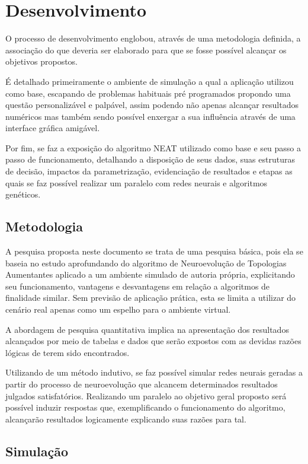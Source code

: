 \chapter{Desenvolvimento}
O processo de desenvolvimento englobou, através de uma metodologia definida,
a associação do que deveria ser elaborado para que se fosse possível alcançar
os objetivos propostos.

É detalhado primeiramente o ambiente de simulação a qual a aplicação utilizou como base,
escapando de problemas habituais pré programados propondo uma questão personalizável e
palpável, assim podendo não apenas alcançar resultados numéricos mas também sendo possível
enxergar a sua influência através de uma interface gráfica amigável.

Por fim, se faz a exposição do algoritmo NEAT utilizado como base e seu passo a passo
de funcionamento, detalhando a disposição de seus dados, suas estruturas de decisão, 
impactos da parametrização, evidenciação de resultados e etapas as quais se faz possível 
realizar um paralelo com redes neurais e algoritmos genéticos.

\section{Metodologia}

A pesquisa proposta neste documento se trata de uma pesquisa básica, pois ela se
baseia no estudo aprofundando do algoritmo de Neuroevolução de Topologias Aumentantes
aplicado a um ambiente simulado de autoria própria, explicitando seu funcionamento,
vantagens e desvantagens em relação a algoritmos de finalidade similar. Sem previsão de
aplicação prática, esta se limita a utilizar do cenário real apenas como um espelho para
o ambiente virtual.

A abordagem de pesquisa quantitativa implica na apresentação dos resultados alcançados
por meio de tabelas e dados que serão expostos com as devidas razões lógicas de terem
sido encontrados.

Utilizando de um método indutivo, se faz possível simular redes neurais geradas a
partir do processo de neuroevolução que alcancem determinados resultados julgados
satisfatórios. Realizando um paralelo ao objetivo geral proposto será possível induzir
respostas que, exemplificando o funcionamento do algoritmo, alcançarão resultados
logicamente explicando suas razões para tal.

\section{Simula{\c c}{\~a}o}

